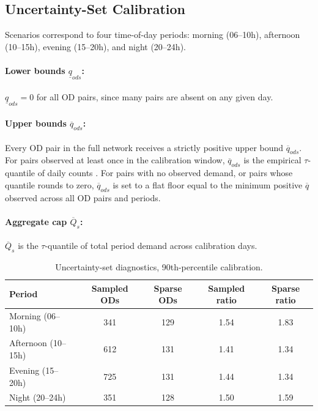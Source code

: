 \documentclass[11pt]{article}
\theoremstyle{definition}
\begin{document}
\subsection{Uncertainty-Set Calibration}

Scenarios correspond to four time-of-day periods: morning (06--10h), afternoon
(10--15h), evening (15--20h), and night (20--24h).

\paragraph{Lower bounds $\underline{q}_{ods}$:}
$\underline{q}_{ods}=0$ for all OD pairs, since many pairs are absent on any
given day.

\paragraph{Upper bounds $\overline{q}_{ods}$:}
Every OD pair in the full network receives a strictly positive upper bound
$\overline{q}_{ods}$. For pairs observed at least once in the calibration
window, $\overline{q}_{ods}$ is the empirical $\tau$-quantile of daily counts
. For pairs with no observed demand, or pairs whose quantile rounds to zero, $\overline{q}_{ods}$ is set to a flat floor equal to the minimum positive $\overline{q}$ observed across all OD pairs and periods.

\paragraph{Aggregate cap $\overline{Q}_s$:}
$\overline{Q}_s$ is the $\tau$-quantile of total period demand across
calibration days.


\begin{table}[h]
	\centering
	\caption{Uncertainty-set diagnostics, 90th-percentile calibration.}
	\label{tab:uncertainty-summary}
	\small
	\begin{tabular}{lcccc}
		\toprule
		Period              & Sampled ODs & Sparse ODs & Sampled ratio & Sparse ratio \\
		\midrule
		Morning (06--10h)   & 341         & 129        & 1.54          & 1.83         \\
		Afternoon (10--15h) & 612         & 131        & 1.41          & 1.34         \\
		Evening (15--20h)   & 725         & 131        & 1.44          & 1.34         \\
		Night (20--24h)     & 351         & 128        & 1.50          & 1.59         \\
		\bottomrule
	\end{tabular}
\end{table}
\end{document}
